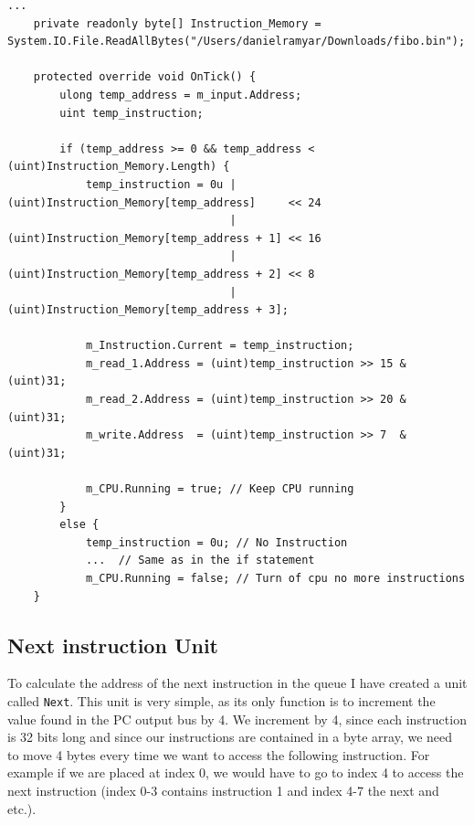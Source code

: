         \begin{minipage}{\linewidth}
            \begin{lstlisting}[language={[Sharp]C}, caption={A slice of the Instruction Memory unit SME code. It contains a single byte array, which holds all the instructions to be run. First we check whether the given address to be accessed lies within instruction array, if not we shut down the CPU. We then use the address to access the correct array elements and create a temporary variable, which contains the instruction, as shown in lines 9-12. Hereafter we slice out the fields in the instruction and place the values in the correct busses. Lastly we tell the simulator to keep the CPU running using the CPU bus.},captionpos=b, label = IMSME]
...
    private readonly byte[] Instruction_Memory = System.IO.File.ReadAllBytes("/Users/danielramyar/Downloads/fibo.bin");
            
    protected override void OnTick() {
        ulong temp_address = m_input.Address;
        uint temp_instruction;
            
        if (temp_address >= 0 && temp_address < (uint)Instruction_Memory.Length) {
            temp_instruction = 0u | (uint)Instruction_Memory[temp_address]     << 24
                                  | (uint)Instruction_Memory[temp_address + 1] << 16
                                  | (uint)Instruction_Memory[temp_address + 2] << 8
                                  | (uint)Instruction_Memory[temp_address + 3];
            
            m_Instruction.Current = temp_instruction;
            m_read_1.Address = (uint)temp_instruction >> 15 & (uint)31; 
            m_read_2.Address = (uint)temp_instruction >> 20 & (uint)31; 
            m_write.Address  = (uint)temp_instruction >> 7  & (uint)31; 
            
            m_CPU.Running = true; // Keep CPU running
        }
        else {
            temp_instruction = 0u; // No Instruction
            ...  // Same as in the if statement
            m_CPU.Running = false; // Turn of cpu no more instructions
    }
            \end{lstlisting}
        \end{minipage}  
        
        
        
    
    \subsection{Next instruction Unit}
        To calculate the address of the next instruction in the queue I have created a unit called \texttt{Next}. This unit is very simple, as its only function is to increment the value found in the PC output bus by 4. We increment by 4, since each instruction is 32 bits long and since our instructions are contained in a byte array, we need to move 4 bytes every time we want to access the following instruction. For example if we are placed at index 0, we would have to go to index 4 to access the next instruction (index 0-3 contains instruction 1 and index 4-7 the next and etc.).
        

